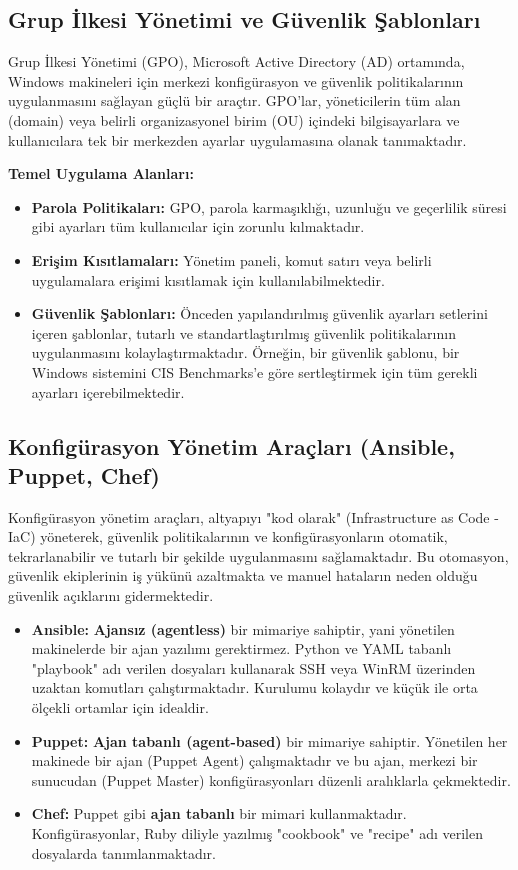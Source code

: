 \subsection{Grup İlkesi Yönetimi ve Güvenlik Şablonları}

Grup İlkesi Yönetimi (GPO), Microsoft Active Directory (AD) ortamında, Windows makineleri için merkezi konfigürasyon ve güvenlik politikalarının uygulanmasını sağlayan güçlü bir araçtır. GPO'lar, yöneticilerin tüm alan (domain) veya belirli organizasyonel birim (OU) içindeki bilgisayarlara ve kullanıcılara tek bir merkezden ayarlar uygulamasına olanak tanımaktadır.

\textbf{Temel Uygulama Alanları:}
\begin{itemize}
    \item \textbf{Parola Politikaları:} GPO, parola karmaşıklığı, uzunluğu ve geçerlilik süresi gibi ayarları tüm kullanıcılar için zorunlu kılmaktadır.
    \item \textbf{Erişim Kısıtlamaları:} Yönetim paneli, komut satırı veya belirli uygulamalara erişimi kısıtlamak için kullanılabilmektedir.
    \item \textbf{Güvenlik Şablonları:} Önceden yapılandırılmış güvenlik ayarları setlerini içeren şablonlar, tutarlı ve standartlaştırılmış güvenlik politikalarının uygulanmasını kolaylaştırmaktadır. Örneğin, bir güvenlik şablonu, bir Windows sistemini CIS Benchmarks'e göre sertleştirmek için tüm gerekli ayarları içerebilmektedir.
\end{itemize}

\subsection{Konfigürasyon Yönetim Araçları (Ansible, Puppet, Chef)}

Konfigürasyon yönetim araçları, altyapıyı "kod olarak" (Infrastructure as Code - IaC) yöneterek, güvenlik politikalarının ve konfigürasyonların otomatik, tekrarlanabilir ve tutarlı bir şekilde uygulanmasını sağlamaktadır. Bu otomasyon, güvenlik ekiplerinin iş yükünü azaltmakta ve manuel hataların neden olduğu güvenlik açıklarını gidermektedir.

\begin{itemize}
    \item \textbf{Ansible:} \textbf{Ajansız (agentless)} bir mimariye sahiptir, yani yönetilen makinelerde bir ajan yazılımı gerektirmez. Python ve YAML tabanlı "playbook" adı verilen dosyaları kullanarak SSH veya WinRM üzerinden uzaktan komutları çalıştırmaktadır. Kurulumu kolaydır ve küçük ile orta ölçekli ortamlar için idealdir.
    \item \textbf{Puppet:} \textbf{Ajan tabanlı (agent-based)} bir mimariye sahiptir. Yönetilen her makinede bir ajan (Puppet Agent) çalışmaktadır ve bu ajan, merkezi bir sunucudan (Puppet Master) konfigürasyonları düzenli aralıklarla çekmektedir.
    \item \textbf{Chef:} Puppet gibi \textbf{ajan tabanlı} bir mimari kullanmaktadır. Konfigürasyonlar, Ruby diliyle yazılmış "cookbook" ve "recipe" adı verilen dosyalarda tanımlanmaktadır.
\end{itemize}

